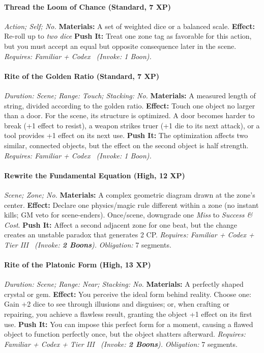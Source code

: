 \documentclass[12pt,twoside]{book}
\begin{document}
\paragraph{Thread the Loom of Chance (Standard, 7 XP)} \emph{Action; Self; No.}
\textbf{Materials:} A set of weighted dice or a balanced scale.
\textbf{Effect:} Re-roll up to \emph{two dice}
\textbf{Push It:} Treat one zone tag as favorable for this action, but you must accept an equal but opposite consequence later in the scene.
\emph{Requires: Familiar + Codex \ (\textit{Invoke:} 1 Boon).}
\paragraph{Rite of the Golden Ratio (Standard, 7 XP)} \emph{Duration: Scene; Range: Touch; Stacking: No.}
\textbf{Materials:} A measured length of string, divided according to the golden ratio.
\textbf{Effect:} Touch one object no larger than a door. For the scene, its structure is optimized. A door becomes harder to break (+1 effect to resist), a weapon strikes truer (+1 die to its next attack), or a tool provides +1 effect on its next use.
\textbf{Push It:} The optimization affects two similar, connected objects, but the effect on the second object is half strength.
\emph{Requires: Familiar + Codex \ (\textit{Invoke:} 1 Boon).}
\paragraph{Rewrite the Fundamental Equation (High, 12 XP)} \emph{Scene; Zone; No.}
\textbf{Materials:} A complex geometric diagram drawn at the zone's center.
\textbf{Effect:} Declare one physics/magic rule different within a zone (no instant kills; GM veto for scene-enders). Once/scene, downgrade one \emph{Miss} to \emph{Success \& Cost}.
\textbf{Push It:} Affect a second adjacent zone for one beat, but the change creates an unstable paradox that generates 2 CP.
\emph{Requires: Familiar + Codex + Tier III \ (\textit{Invoke:} \textbf{2 Boons}).}
\emph{Obligation:} 7 segments.

\paragraph{Rite of the Platonic Form (High, 13 XP)} \emph{Duration: Scene; Range: Near; Stacking: No.}
\textbf{Materials:} A perfectly shaped crystal or gem.
\textbf{Effect:} You perceive the ideal form behind reality. Choose one: Gain +2 dice to see through illusions and disguises; or, when crafting or repairing, you achieve a flawless result, granting the object +1 effect on its first use.
\textbf{Push It:} You can impose this perfect form for a moment, causing a flawed object to function perfectly once, but the object shatters afterward.
\emph{Requires: Familiar + Codex + Tier III \ (\textit{Invoke:} \textbf{2 Boons}).}
\emph{Obligation:} 7 segments.
\end{document}
